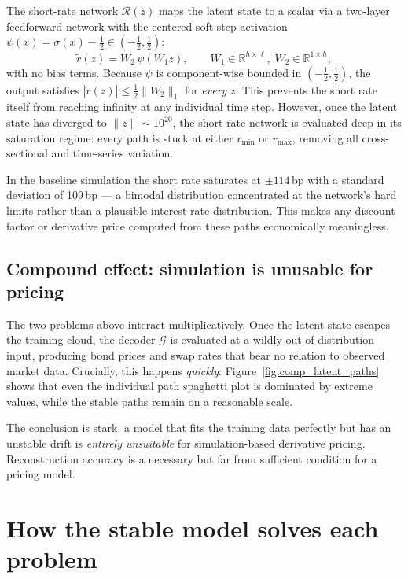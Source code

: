 The short-rate network $\mathcal{R}(z)$ maps the latent state to a scalar via
a two-layer feedforward network with the centered soft-step activation
$\psi(x)=\sigma(x)-\tfrac{1}{2}\in(-\tfrac{1}{2},\tfrac{1}{2})$:
\[
    \tilde{r}(z)=W_2\,\psi(W_1 z),\qquad
    W_1\in\mathbb{R}^{h\times\ell},\;W_2\in\mathbb{R}^{1\times h},
\]
with no bias terms. Because $\psi$ is component-wise bounded in
$(-\tfrac{1}{2},\tfrac{1}{2})$, the output satisfies
$|\tilde{r}(z)|\leq\tfrac{1}{2}\|W_2\|_1$ for \emph{every} $z$.
This prevents the short rate itself from reaching infinity at any individual
time step.
However, once the latent state has diverged to $\|z\| \sim 10^{20}$, the
short-rate network is evaluated deep in its saturation regime: every path is
stuck at either $r_{\min}$ or $r_{\max}$, removing all cross-sectional and
time-series variation.

In the baseline simulation the short rate saturates at $\pm 114$\,bp with a
standard deviation of 109\,bp --- a bimodal distribution concentrated at the
network's hard limits rather than a plausible interest-rate distribution.
This makes any discount factor or derivative price computed from these paths
economically meaningless.

\subsection{Compound effect: simulation is unusable for pricing}
\label{subsec:compound_effect}

The two problems above interact multiplicatively.
Once the latent state escapes the training cloud, the decoder $\mathcal{G}$ is
evaluated at a wildly out-of-distribution input, producing bond prices and swap
rates that bear no relation to observed market data.
Crucially, this happens \emph{quickly}: Figure~\ref{fig:comp_latent_paths} shows
that even the individual path spaghetti plot is dominated by extreme values,
while the stable paths remain on a reasonable scale.

The conclusion is stark: a model that fits the training data perfectly but has an
unstable drift is \emph{entirely unsuitable} for simulation-based derivative pricing.
Reconstruction accuracy is a necessary but far from sufficient condition for a
pricing model.


\section{How the stable model solves each problem}
\label{sec:sim_stable_solutions}

